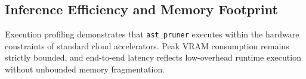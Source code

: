 \subsection{Inference Efficiency and Memory Footprint}
Execution profiling demonstrates that \texttt{ast\_pruner} executes within the hardware constraints of standard cloud accelerators. Peak VRAM consumption remains strictly bounded, and end-to-end latency reflects low-overhead runtime execution without unbounded memory fragmentation.
